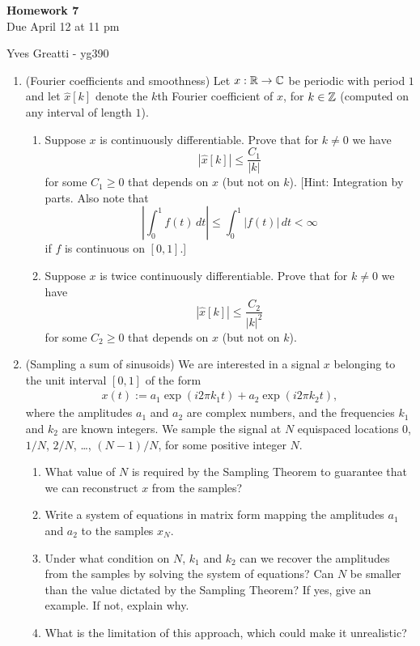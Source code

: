 \documentclass[12pt,twoside]{article}
\begin{document}
\begin{center}
{\large{\textbf{Homework 7}} } \vspace{0.2cm}\\
Due April 12 at 11 pm
\end{center}
Yves Greatti - yg390\\

\begin{enumerate}

\item (Fourier coefficients and smoothness) Let $x:\mathbb{R}\to\mathbb{C}$ be
  periodic with period $1$
  and let $\hat{x}[k]$ denote the $k$th Fourier coefficient of $x$,
  for $k\in\mathbb{Z}$ (computed on any interval of length $1$).
  \begin{enumerate}
  \item Suppose $x$ is continuously differentiable. Prove that for
    $k\neq 0$ we have
    $$|\hat{x}[k]| \leq \frac{C_1}{|k|}$$
    for some $C_1\geq0$ that depends on $x$ (but not on $k$). [Hint:
      Integration by parts.  Also note that
      $$\left|\int_0^1 f(t)\,dt\right| \leq \int_0^1 |f(t)|\,dt<\infty$$
    if $f$ is continuous on $[0,1]$.]
  \item Suppose $x$ is twice continuously differentiable.
    Prove that for $k\neq 0$ we have
    $$|\hat{x}[k]| \leq \frac{C_2}{|k|^2}$$
    for some $C_2\geq0$ that depends on $x$ (but not on $k$).
  \end{enumerate}
  
\item (Sampling a sum of sinusoids) We are interested in a signal $x$ belonging to the unit interval $[0,1]$ of the form
\begin{align}
x(t) := a_1 \exp (i 2 \pi k_1 t ) + a_2 \exp (i 2 \pi k_2 t ),
\end{align}
where the amplitudes $a_1$ and $a_2$ are complex numbers, and the
frequencies $k_1$ and $k_2$ are known integers.
We sample the signal at $N$ equispaced locations $0$, $1/N$, $2/N$,
\ldots, $(N-1)/N$, for some positive integer $N$.  
\begin{enumerate}
\item What value of $N$ is required by the Sampling Theorem to
  guarantee that we can reconstruct $x$ from the samples? 
\item Write a system of equations in matrix form mapping the
  amplitudes $a_1$ and $a_2$ to the samples $x_{N}$. 
  \item Under what condition on $N$, $k_1$ and $k_2$ can we recover the
  amplitudes from the samples by solving the system of equations? 
  Can $N$ be smaller than the value dictated by the Sampling Theorem?
  If yes, give an example. If not, explain why.  
  \item What is the limitation of this approach, which could make it unrealistic?
\end{enumerate}
   

\end{enumerate}
\end{document}

